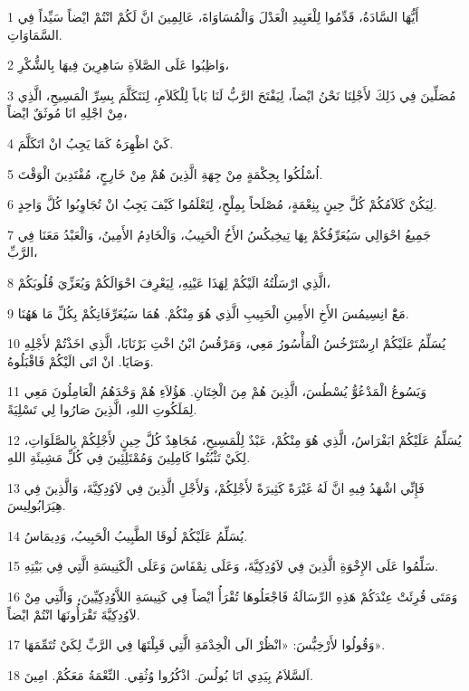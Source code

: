 \par 1 أَيُّهَا السَّادَةُ، قَدِّمُوا لِلْعَبِيدِ الْعَدْلَ وَالْمُسَاوَاةَ، عَالِمِينَ انَّ لَكُمْ انْتُمْ ايْضاً سَيِّداً فِي السَّمَاوَاتِ.
\par 2 وَاظِبُوا عَلَى الصَّلاَةِ سَاهِرِينَ فِيهَا بِالشُّكْرِ،
\par 3 مُصَلِّينَ فِي ذَلِكَ لأَجْلِنَا نَحْنُ ايْضاً، لِيَفْتَحَ الرَّبُّ لَنَا بَاباً لِلْكَلاَمِ، لِنَتَكَلَّمَ بِسِرِّ الْمَسِيحِ، الَّذِي مِنْ اجْلِهِ انَا مُوثَقٌ ايْضاً،
\par 4 كَيْ اظْهِرَهُ كَمَا يَجِبُ انْ اتَكَلَّمَ.
\par 5 اُسْلُكُوا بِحِكْمَةٍ مِنْ جِهَةِ الَّذِينَ هُمْ مِنْ خَارِجٍ، مُفْتَدِينَ الْوَقْتَ.
\par 6 لِيَكُنْ كَلاَمُكُمْ كُلَّ حِينٍ بِنِعْمَةٍ، مُصْلَحاً بِمِلْحٍ، لِتَعْلَمُوا كَيْفَ يَجِبُ انْ تُجَاوِبُوا كُلَّ وَاحِدٍ.
\par 7 جَمِيعُ احْوَالِي سَيُعَرِّفُكُمْ بِهَا تِيخِيكُسُ الأَخُ الْحَبِيبُ، وَالْخَادِمُ الأَمِينُ، وَالْعَبْدُ مَعَنَا فِي الرَّبِّ،
\par 8 الَّذِي ارْسَلْتُهُ الَيْكُمْ لِهَذَا عَيْنِهِ، لِيَعْرِفَ احْوَالَكُمْ وَيُعَزِّيَ قُلُوبَكُمْ،
\par 9 مَعَْ انِسِيمُسَ الأَخِ الأَمِينِ الْحَبِيبِ الَّذِي هُوَ مِنْكُمْ. هُمَا سَيُعَرِّفَانِكُمْ بِكُلِّ مَا هَهُنَا.
\par 10 يُسَلِّمُ عَلَيْكُمْ ارِسْتَرْخُسُ الْمَأْسُورُ مَعِي، وَمَرْقُسُ ابْنُ اخْتِ بَرْنَابَا، الَّذِي اخَذْتُمْ لأَجْلِهِ وَصَايَا. انْ اتَى الَيْكُمْ فَاقْبَلُوهُ.
\par 11 وَيَسُوعُ الْمَدْعُوُّ يُسْطُسَ، الَّذِينَ هُمْ مِنَ الْخِتَانِ. هَؤُلاَءِ هُمْ وَحْدَهُمُ الْعَامِلُونَ مَعِي لِمَلَكُوتِ اللهِ، الَّذِينَ صَارُوا لِي تَسْلِيَةً.
\par 12 يُسَلِّمُ عَلَيْكُمْ ابَفْرَاسُ، الَّذِي هُوَ مِنْكُمْ، عَبْدٌ لِلْمَسِيحِ، مُجَاهِدٌ كُلَّ حِينٍ لأَجْلِكُمْ بِالصَّلَوَاتِ، لِكَيْ تَثْبُتُوا كَامِلِينَ وَمُمْتَلِئِينَ فِي كُلِّ مَشِيئَةِ اللهِ.
\par 13 فَإِنِّي اشْهَدُ فِيهِ انَّ لَهُ غَيْرَةً كَثِيرَةً لأَجْلِكُمْ، وَلأَجْلِ الَّذِينَ فِي لاَوُدِكِيَّةَ، وَالَّذِينَ فِي هِيَرَابُولِيسَ.
\par 14 يُسَلِّمُ عَلَيْكُمْ لُوقَا الطَّبِيبُ الْحَبِيبُ، وَدِيمَاسُ.
\par 15 سَلِّمُوا عَلَى الإِخْوَةِ الَّذِينَ فِي لاَوُدِكِيَّةَ، وَعَلَى نِمْفَاسَ وَعَلَى الْكَنِيسَةِ الَّتِي فِي بَيْتِهِ.
\par 16 وَمَتَى قُرِئَتْ عِنْدَكُمْ هَذِهِ الرِّسَالَةُ فَاجْعَلُوهَا تُقْرَأُ ايْضاً فِي كَنِيسَةِ اللاَّوُدِكِيِّينَ، وَالَّتِي مِنْ لاَوُدِكِيَّةَ تَقْرَأُونَهَا انْتُمْ ايْضاً.
\par 17 وَقُولُوا لأَرْخِبُّسَ: «انْظُرْ الَى الْخِدْمَةِ الَّتِي قَبِلْتَهَا فِي الرَّبِّ لِكَيْ تُتَمِّمَهَا».
\par 18 اَلسَّلاَمُ بِيَدِي انَا بُولُسَ. اذْكُرُوا وُثُقِي. النِّعْمَةُ مَعَكُمْ. امِينَ.


